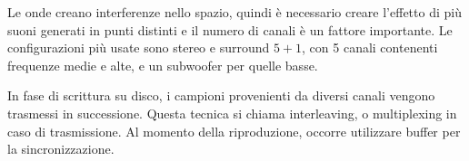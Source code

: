 Le onde creano interferenze nello spazio, quindi è necessario creare l'effetto di più suoni generati in punti distinti e il numero di canali è un fattore importante. Le configurazioni più usate sono stereo e surround $5 + 1$, con 5 canali contenenti frequenze medie e alte, e un subwoofer per quelle basse. 

In fase di scrittura su disco, i campioni provenienti da diversi canali vengono trasmessi in successione. Questa tecnica si chiama interleaving, o multiplexing in caso di trasmissione. Al momento della riproduzione, occorre utilizzare buffer per la sincronizzazione.
